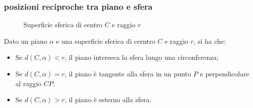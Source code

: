 \documentclass{article}     %
\begin{document}
            \subsubsection{posizioni reciproche tra piano e sfera}
            \begin{wrapfigure}{r}{0.3\textwidth}
                \begin{center}
                \end{center}
                \caption{Superficie sferica di centro $C$ e raggio $r$}
            \end{wrapfigure}
            Dato un piano $\alpha$ e una superficie sferica di cerntro $C$ e raggio $r$, si ha che:
            \begin{itemize}
                \item Se $d(C,\alpha)<r$, il piano interseca la sfera lungo una circonferenza;
                \item Se $d(C,\alpha)=r$, il piano è tangente alla sfera in un punto $P$ e perpendicolare al raggio $CP$.
                \item Se $d(C,\alpha)>r$, il piano è esterno alla sfera.
            \end{itemize}
\end{document}
